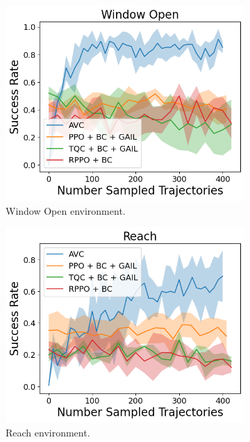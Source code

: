 \begin{figure}[htbp]
  \centering
  \begin{subfigure}[b]{0.45\textwidth}
    \includegraphics[width=\textwidth]{images/4_400/Window Open.png}
    \caption{Window Open environment.}
  \end{subfigure}
  \hfill
  \begin{subfigure}[b]{0.45\textwidth}
    \includegraphics[width=\textwidth]{images/4_400/Reach.png}
    \caption{Reach environment.}
  \end{subfigure}
  \medskip
  \begin{subfigure}[b]{0.45\textwidth}

\end{subfigure}
\end{figure}
